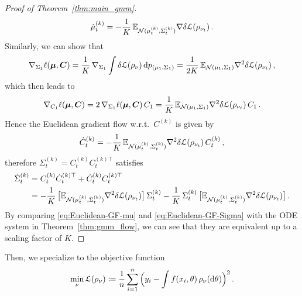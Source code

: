 \documentclass{custom}
\begin{document}
\begin{proof}[Proof of Theorem~\ref{thm:main_gmm}]
\begin{equation}
\dot{\mu}^{(k)}_{t} = -\frac{1}{K}\, \mathbb E_{\mathcal N(\mu^{(k)}_t,\Sigma^{(k)}_t)}\nabla \delta \EuScript{L} (\rho_{\nu_t})\,.
\end{equation}
Similarly, we can show that
\[
\nabla_{\Sigma_1} \ell(\boldsymbol \mu,\boldsymbol C) = \frac{1}{K}\, \nabla_{\Sigma_1} \int \delta \EuScript{L}(\rho_\nu)\, \mathrm d p_{(\mu_1,\Sigma_1)} = \frac{1}{2K}\, \mathbb E_{\mathcal N(\mu_1,\Sigma_1)}\nabla^2 \delta \EuScript{L} (\rho_{\nu_t})\,,
\]
which then leads to
\[
\nabla_{C_1} \ell(\boldsymbol \mu,\boldsymbol C) = 2\,\nabla_{\Sigma_1} \ell(\boldsymbol \mu,\boldsymbol C)\, C_1 = \frac{1}{K}\, \mathbb E_{\mathcal N(\mu_1,\Sigma_1)}\nabla^2 \delta \EuScript{L} (\rho_{\nu_t}) \,C_1\,.
\]
Hence the Euclidean gradient flow w.r.t.~$C^{(k)}$ is given by
\[
\dot{C}^{(k)}_{t} = -\frac{1}{K}\, \mathbb E_{\mathcal N(\mu^{(k)}_t,\Sigma^{(k)}_t)} \nabla^2 \delta \EuScript{L} (\rho_{\nu_t}) \,C^{(k)}_t\,,
\]
therefore $\Sigma^{(k)}_t = C^{(k)}_t C^{(k)\top}_t$ satisfies
\begin{align} 
\dot{\Sigma}^{(k)}_{t} &= C^{(k)}_t \dot{C}^{(k)\top}_{t} + \dot{C}^{(k)}_{t} C^{(k)\top}_t \nonumber\\
&= -\frac{1}{K}\, \big[\mathbb E_{\mathcal N(\mu^{(k)}_t,\Sigma^{(k)}_t)} \nabla^2 \delta \EuScript{L} (\rho_{\nu_t}) \big] \,\Sigma^{(k)}_t -\frac{1}{K} \,\Sigma^{(k)}_t\,\big[\mathbb E_{\mathcal N(\mu^{(k)}_t,\Sigma^{(k)}_t)} \nabla^2 \delta \EuScript{L} (\rho_{\nu_t}) \big]\,.\label{eq:Euclidean-GF-Sigma}
\end{align}
By comparing \eqref{eq:Euclidean-GF-mu} and \eqref{eq:Euclidean-GF-Sigma} with the ODE system in Theorem~\ref{thm:gmm_flow}, we can see that they are equivalent up to a scaling factor of $K$.
\end{proof}

Then, we specialize to the objective function 
\[
\min_{\nu}\EuScript{L}(\rho_{\nu})\coloneqq\frac{1}{n}\sum_{i=1}^{n} {\Bigl(y_i - \int f(x_{i},\theta)\,\rho_{\nu}(\mathrm d \theta)\Bigr)^{2}}\,.
\]
\end{document}
